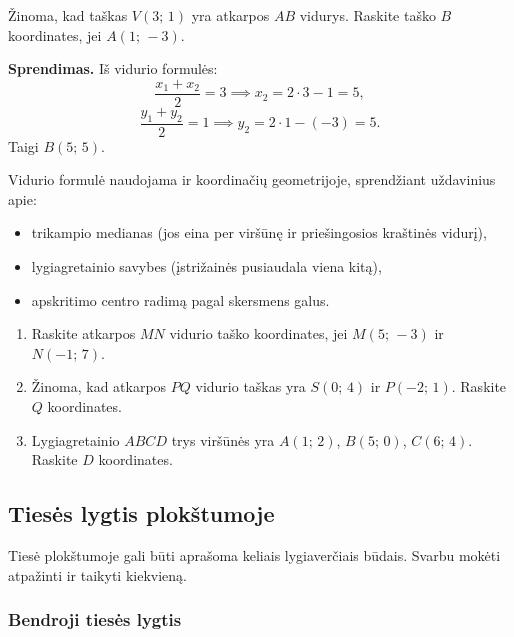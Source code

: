 \begin{example}
Žinoma, kad taškas $V(3;\, 1)$ yra atkarpos $AB$ vidurys. Raskite taško $B$ koordinates, jei $A(1;\, -3)$.

\textbf{Sprendimas.} Iš vidurio formulės:
\[
    \frac{x_1 + x_2}{2} = 3 \implies x_2 = 2 \cdot 3 - 1 = 5,
\]
\[
    \frac{y_1 + y_2}{2} = 1 \implies y_2 = 2 \cdot 1 - (-3) = 5.
\]
Taigi $B(5;\, 5)$.
\end{example}

\begin{remark}
Vidurio formulė naudojama ir koordinačių geometrijoje, sprendžiant uždavinius apie:
\begin{itemize}
    \item trikampio medianas (jos eina per viršūnę ir priešingosios kraštinės vidurį),
    \item lygiagretainio savybes (įstrižainės pusiaudala viena kitą),
    \item apskritimo centro radimą pagal skersmens galus.
\end{itemize}
\end{remark}

\begin{exercise}
\begin{enumerate}[label=\alph*)]
    \item Raskite atkarpos $MN$ vidurio taško koordinates, jei $M(5;\,-3)$ ir $N(-1;\,7)$.
    \item Žinoma, kad atkarpos $PQ$ vidurio taškas yra $S(0;\,4)$ ir $P(-2;\,1)$. Raskite $Q$ koordinates.
    \item Lygiagretainio $ABCD$ trys viršūnės yra $A(1;\,2)$, $B(5;\,0)$, $C(6;\,4)$. Raskite $D$ koordinates.
\end{enumerate}
\end{exercise}

\subsection{Tiesės lygtis plokštumoje}

Tiesė plokštumoje gali būti aprašoma keliais lygiaverčiais būdais. Svarbu mokėti atpažinti ir taikyti kiekvieną.

\subsubsection*{Bendroji tiesės lygtis}

